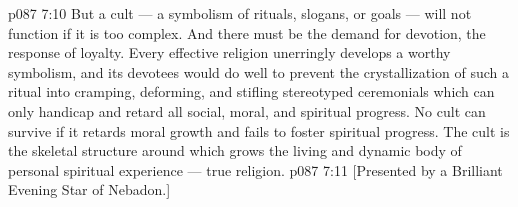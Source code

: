 \vs p087 7:10 But a cult --- a symbolism of rituals, slogans, or goals --- will not function if it is too complex. And there must be the demand for devotion, the response of loyalty. Every effective religion unerringly develops a worthy symbolism, and its devotees would do well to prevent the crystallization of such a ritual into cramping, deforming, and stifling stereotyped ceremonials which can only handicap and retard all social, moral, and spiritual progress. No cult can survive if it retards moral growth and fails to foster spiritual progress. The cult is the skeletal structure around which grows the living and dynamic body of personal spiritual experience --- true religion.
\vsetoff
\vs p087 7:11 [Presented by a Brilliant Evening Star of Nebadon.]
\quizlink

